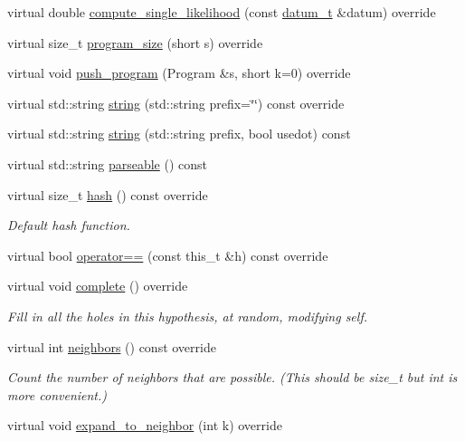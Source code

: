 \begin{DoxyCompactItemize}
virtual double \hyperlink{class_l_o_t_hypothesis_aba33afbf945d7eed8c7e07d5a0d31562}{compute\+\_\+single\+\_\+likelihood} (const \hyperlink{class_l_o_t_hypothesis_a3da7a75d135620a3d48a3bfe0be11401}{datum\+\_\+t} \&datum) override
\item 
virtual size\+\_\+t \hyperlink{class_l_o_t_hypothesis_a4623fb6919b2bf209ba8cc4a4ba4a9bd}{program\+\_\+size} (short s) override
\item 
virtual void \hyperlink{class_l_o_t_hypothesis_aef932da4e5ab819282ee59e17e65491f}{push\+\_\+program} (Program \&s, short k=0) override
\item 
virtual std\+::string \hyperlink{class_l_o_t_hypothesis_a0d4f526264b781130674863164707927}{string} (std\+::string prefix=\char`\"{}\char`\"{}) const override
\item 
virtual std\+::string \hyperlink{class_l_o_t_hypothesis_ac3ed1c6b744dd7e1a33b5b64f94ba509}{string} (std\+::string prefix, bool usedot) const
\item 
virtual std\+::string \hyperlink{class_l_o_t_hypothesis_a46846c5e7d9767429ad5c90c0a53838c}{parseable} () const
\item 
virtual size\+\_\+t \hyperlink{class_l_o_t_hypothesis_a1157a3217d41d4c06105f1166d8c1808}{hash} () const override
\begin{DoxyCompactList}\small\item\em Default hash function. \end{DoxyCompactList}\item 
virtual bool \hyperlink{class_l_o_t_hypothesis_a0b157edae49758c4159a196e8a458fa7}{operator==} (const this\+\_\+t \&h) const override
\item 
virtual void \hyperlink{class_l_o_t_hypothesis_a1c4f97c379f7acf16d4773790b9e7a41}{complete} () override
\begin{DoxyCompactList}\small\item\em Fill in all the holes in this hypothesis, at random, modifying self. \end{DoxyCompactList}\item 
virtual int \hyperlink{class_l_o_t_hypothesis_ac1fcba4457efaf7566ee6454c0785e74}{neighbors} () const override
\begin{DoxyCompactList}\small\item\em Count the number of neighbors that are possible. (This should be size\+\_\+t but int is more convenient.) \end{DoxyCompactList}\item 
virtual void \hyperlink{class_l_o_t_hypothesis_a448c8ed494a4199c63e676b4a06b4af6}{expand\+\_\+to\+\_\+neighbor} (int k) override

\end{DoxyCompactItemize}
